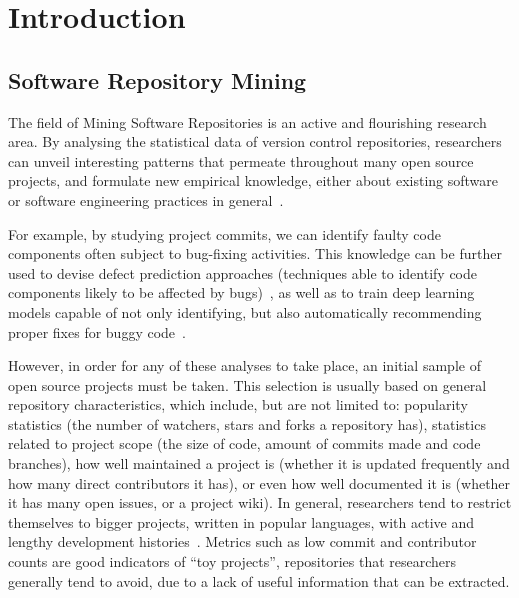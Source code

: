 \chapter{Introduction}

\section{Software Repository Mining}

The field of Mining Software Repositories is an active and flourishing research area.
By analysing the statistical data of version control repositories, researchers can unveil interesting patterns that permeate throughout many open source projects, and formulate new empirical knowledge, either about existing software or software engineering practices in general~\cite{MSR}.

For example, by studying project commits, we can identify faulty code components often subject to bug-fixing activities.
This knowledge can be further used to devise defect prediction approaches (techniques able to identify code components likely to be affected by bugs)~\cite{DEFECT1,DEFECT2}, as well as to train deep learning models capable of not only identifying, but also automatically recommending proper fixes for buggy code~\cite{BUGFIX}.

However, in order for any of these analyses to take place, an initial sample of open source projects must be taken.
This selection is usually based on general repository characteristics, which include, but are not limited to: popularity statistics (the number of watchers, stars and forks a repository has), statistics related to project scope (the size of code, amount of commits made and code branches), how well maintained a project is (whether it is updated frequently and how many direct contributors it has), or even how well documented it is (whether it has many open issues, or a project wiki).
In general, researchers tend to restrict themselves to bigger projects, written in popular languages, with active and lengthy development histories~\cite{PDSSE}.
Metrics such as low commit and contributor counts are good indicators of ``toy projects'', repositories that researchers generally tend to avoid, due to a lack of useful information that can be extracted.


